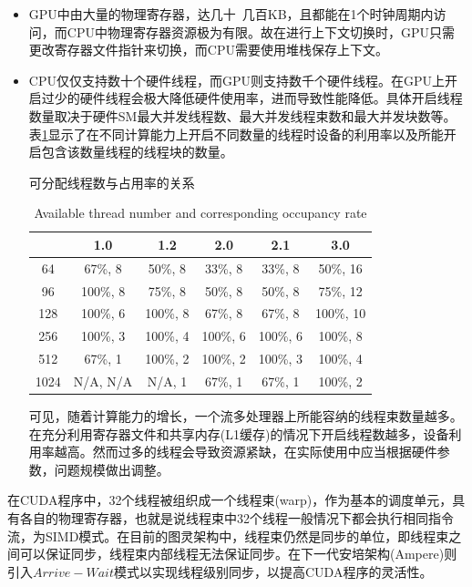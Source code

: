 \begin{itemize}
	\item GPU中由大量的物理寄存器，达几十~几百KB，且都能在1个时钟周期内访问，而CPU中物理寄存器资源极为有限。故在进行上下文切换时，GPU只需更改寄存器文件指针来切换，而CPU需要使用堆栈保存上下文。
	\item CPU仅仅支持数十个硬件线程，而GPU则支持数千个硬件线程。在GPU上开启过少的硬件线程会极大降低硬件使用率，进而导致性能降低。具体开启线程数量取决于硬件SM最大并发线程数、最大并发线程束数和最大并发块数等。表\ref{table-占用率}显示了在不同计算能力上开启不同数量的线程时设备的利用率以及所能开启包含该数量线程的线程块的数量。\\
	\begin{table}
	\centering
	\renewcommand{\thetable}{\arabic{section}-\arabic{table} }
	\renewcommand{\tablename}{表}
	\caption{可分配线程数与占用率的关系}
	\addtocounter{table}{-1}
	\renewcommand{\thetable}{\arabic{section}-\arabic{table} }
	\renewcommand{\tablename}{Table}
	\caption{Available thread number and corresponding occupancy rate}
	\begin{tabular}{cccccc}
		\toprule
			&	1.0	&1.2	&2.0	&2.1	&3.0 \\
		\midrule
		64	&	67\%, 8		&	50\%, 8		&	33\%, 8		&	33\%, 8		&	50\%, 16	\\
		96	&	100\%, 8	&	75\%, 8		&	50\%, 8		&	50\%, 8		&	75\%, 12	\\
		128	&	100\%, 6	&	100\%, 8	&	67\%, 8		&	67\%, 8		&	100\%, 10	\\
		256	&	100\%, 3	&	100\%, 4	&	100\%, 6	&	100\%, 6	&	100\%, 8	\\
		512	&	67\%, 1		&	100\%, 2	&	100\%, 2	&	100\%, 3	&	100\%, 4	\\
		1024&	N/A, N/A	&	N/A, 1		&	67\%, 1		&	67\%, 1		&	100\%, 2	\\
		
		\bottomrule
	\end{tabular} \label{table-占用率}
	\end{table}
	可见，随着计算能力的增长，一个流多处理器上所能容纳的线程束数量越多。在充分利用寄存器文件和共享内存(L1缓存)的情况下开启线程数越多，设备利用率越高。然而过多的线程会导致资源紧缺，在实际使用中应当根据硬件参数，问题规模做出调整。
\end{itemize}
\par 在CUDA程序中，32个线程被组织成一个线程束(warp)，作为基本的调度单元，具有各自的物理寄存器，也就是说线程束中32个线程一般情况下都会执行相同指令流，为SIMD模式。在目前的图灵架构中，线程束仍然是同步的单位，即线程束之间可以保证同步，线程束内部线程无法保证同步。在下一代安培架构(Ampere)则引入$ Arrive-Wait $模式以实现线程级别同步，以提高CUDA程序的灵活性。 
